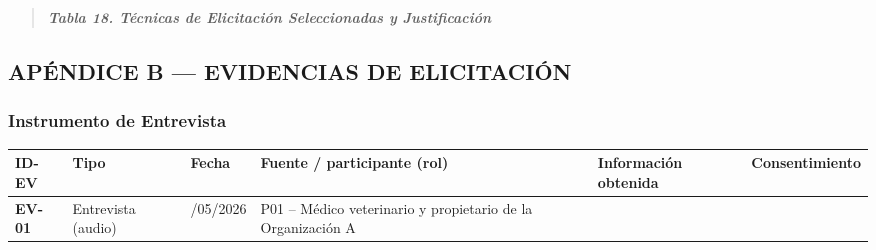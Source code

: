 \documentclass[
]{article}
\newcounter{none} %
\begin{document}
\begin{quote}
\protect{}\label{_bookmark74}{}\emph{\textbf{Tabla 18.
Técnicas de Elicitación Seleccionadas y Justificación}}
\end{quote}

\subsection{APÉNDICE B --- EVIDENCIAS DE
ELICITACIÓN}\label{apuxe9ndice-b-evidencias-de-elicitaciuxf3n}

\subsubsection{Instrumento de
Entrevista}\label{instrumento-de-entrevista}

{\def\LTcaptype{none} %
\begin{longtable}[]{|
  >{\raggedright\arraybackslash}p{}|
  >{\raggedright\arraybackslash}p{}|
  >{\centering\arraybackslash}p{}|
  >{\raggedright\arraybackslash}p{}|
  >{\raggedright\arraybackslash}p{}|
  >{\raggedright\arraybackslash}p{}|}
\hline
\begin{minipage}[b]{\linewidth}\raggedright
\textbf{ID-EV}
\end{minipage} & \begin{minipage}[b]{\linewidth}\centering
\textbf{Tipo}
\end{minipage} & \begin{minipage}[b]{\linewidth}\centering
\textbf{Fecha}
\end{minipage} & \begin{minipage}[b]{\linewidth}\raggedright
\textbf{Fuente / participante (rol)}
\end{minipage} & \begin{minipage}[b]{\linewidth}\raggedright
\textbf{Información obtenida}
\end{minipage} & \begin{minipage}[b]{\linewidth}\raggedright
\textbf{Consenti\-miento}
\end{minipage} \\
\hline
\endhead
\hline
\endlastfoot
\textbf{EV-01} & Entrevista (audio) & 23/05/2026 & P01
-- Médico veterinario y propietario de la Organización A &

\end{longtable}}
\end{document}
